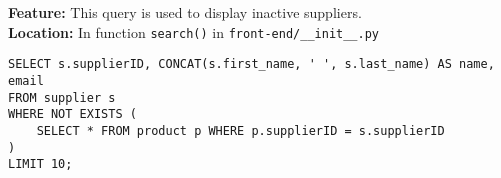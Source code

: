 \textbf{Feature:} This query is used to display inactive suppliers. \\
\textbf{Location:} In function \texttt{search()} in \texttt{front-end/\_\_init\_\_.py}

\begin{lstlisting}
SELECT s.supplierID, CONCAT(s.first_name, ' ', s.last_name) AS name, email
FROM supplier s
WHERE NOT EXISTS (
    SELECT * FROM product p WHERE p.supplierID = s.supplierID
)
LIMIT 10;
\end{lstlisting}